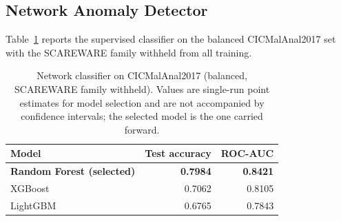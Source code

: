 \documentclass[manuscript,screen,review]{acmart}
\begin{document}
\subsection{Network Anomaly Detector}
Table~\ref{tab:net} reports the supervised classifier on the balanced CICMalAnal2017 set with the SCAREWARE family withheld from all training.

\begin{table}[t]
\centering
\caption{Network classifier on CICMalAnal2017 (balanced, SCAREWARE family withheld). Values are single-run point estimates for model selection and are not accompanied by confidence intervals; the selected model is the one carried forward.}
\label{tab:net}
\small
\begin{tabular}{lrr}
\toprule
Model & Test accuracy & ROC-AUC \\
\midrule
\textbf{Random Forest (selected)} & \textbf{0.7984} & \textbf{0.8421} \\
XGBoost & 0.7062 & 0.8105 \\
LightGBM & 0.6765 & 0.7843 \\
\bottomrule
\end{tabular}
\end{table}
\end{document}
